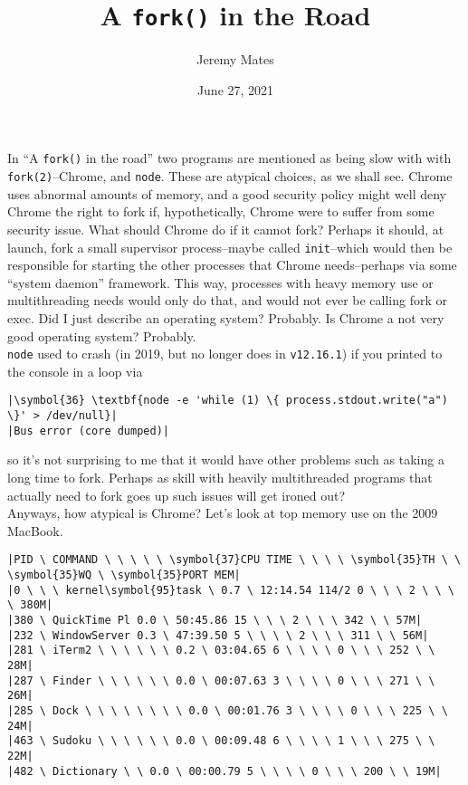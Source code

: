 \documentclass[10pt,a4paper]{article}
\title{A \texttt{fork()} in the Road}
\author{Jeremy Mates}
\date{June 27, 2021}
\begin{document}

\maketitle

In ``A \texttt{fork()} in the road''\cite{Hotos2019} two programs are
mentioned as being slow with with \texttt{fork(2)}--Chrome, and
\texttt{node}. These are atypical choices, as we shall see. Chrome uses
abnormal amounts of memory, and a good security policy might well deny
Chrome the right to fork if, hypothetically, Chrome were to suffer from
some security issue. What should Chrome do if it cannot fork? Perhaps it
should, at launch, fork a small supervisor process--maybe called
\texttt{init}--which would then be responsible for starting the other
processes that Chrome needs--perhaps via some ``system daemon''
framework. This way, processes with heavy memory use or multithreading
needs would only do that, and would not ever be calling fork or exec.
Did I just describe an operating system? Probably. Is Chrome a not very
good operating system? Probably. \\

\texttt{node} used to crash (in 2019, but no longer does in
\texttt{v12.16.1}) if you printed to the console in a loop via

\begin{lstlisting}
|\symbol{36} \textbf{node -e 'while (1) \{ process.stdout.write("a") \}' > /dev/null}|
|Bus error (core dumped)|
\end{lstlisting}

so it's not surprising to me that it would have other problems such as
taking a long time to fork. Perhaps as skill with heavily
multithreaded programs that actually need to fork goes up such issues
will get ironed out? \\

Anyways, how atypical is Chrome? Let's look at top memory use on the
2009 MacBook.

\begin{lstlisting}
|PID \ COMMAND \ \ \ \ \ \symbol{37}CPU TIME \ \ \ \ \symbol{35}TH \ \ \symbol{35}WQ \ \symbol{35}PORT MEM|
|0 \ \ \ kernel\symbol{95}task \ 0.7 \ 12:14.54 114/2 0 \ \ \ 2 \ \ \ \ 380M|
|380 \ QuickTime Pl 0.0 \ 50:45.86 15 \ \ \ 2 \ \ \ 342 \ \ 57M|
|232 \ WindowServer 0.3 \ 47:39.50 5 \ \ \ \ 2 \ \ \ 311 \ \ 56M|
|281 \ iTerm2 \ \ \ \ \ \ 0.2 \ 03:04.65 6 \ \ \ \ 0 \ \ \ 252 \ \ 28M|
|287 \ Finder \ \ \ \ \ \ 0.0 \ 00:07.63 3 \ \ \ \ 0 \ \ \ 271 \ \ 26M|
|285 \ Dock \ \ \ \ \ \ \ \ 0.0 \ 00:01.76 3 \ \ \ \ 0 \ \ \ 225 \ \ 24M|
|463 \ Sudoku \ \ \ \ \ \ 0.0 \ 00:09.48 6 \ \ \ \ 1 \ \ \ 275 \ \ 22M|
|482 \ Dictionary \ \ 0.0 \ 00:00.79 5 \ \ \ \ 0 \ \ \ 200 \ \ 19M|
\end{lstlisting}
\end{document}
